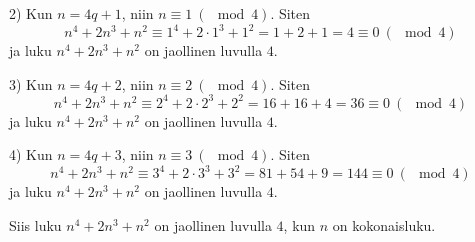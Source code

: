 \begin{esimerkki}
2) Kun $n = 4q + 1$, niin $n \equiv 1\ (\mod 4)$. Siten
\[
n^4 + 2n^3 + n^2 \equiv 1^4 + 2 \cdot 1^3 + 1^2 = 1 + 2 + 1 = 4
\equiv 0\ (\mod 4)
\]
ja luku $n^4 + 2n^3 + n^2$ on jaollinen luvulla $4$.

3) Kun $n = 4q + 2$, niin $n \equiv 2\ (\mod 4)$. Siten
\[
n^4 + 2n^3 + n^2 \equiv 2^4 + 2 \cdot 2^3 + 2^2 = 16 + 16 + 4 =
36 \equiv 0\ (\mod 4)
\]
ja luku $n^4 + 2n^3 + n^2$ on jaollinen luvulla $4$.

4) Kun $n = 4q + 3$, niin $n \equiv 3\ (\mod 4)$. Siten
\[
n^4 + 2n^3 + n^2 \equiv 3^4 + 2 \cdot 3^3 + 3^2 = 81 + 54 + 9 =
144 \equiv 0\ (\mod 4)
\]
ja luku $n^4 + 2n^3 + n^2$ on jaollinen luvulla $4$.

Siis luku $n^4 + 2n^3 + n^2$ on jaollinen luvulla $4$, kun $n$ on
kokonaisluku.
\end{esimerkki}


\Harjoitustehtavat

